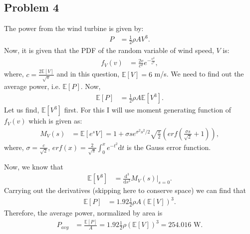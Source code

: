 \subsection*{Problem 4}
The power from the wind turbine is given by:
\begin{align*}
	P &= \frac{1}{2}\rho A V^3.
\end{align*}
Now, it is given that the PDF of the random variable of wind speed, $V$ is:
\begin{align*}
	f_V(v) &= \frac{2v}{c^2}e^{-\frac{v^2}{c^2}},
\end{align*}
where, $c=\frac{2\mathbb{E}[V]}{\sqrt{\pi}}$ and in this question, $\mathbb{E}[V] = 6$ m/s. We need to find out the average power, i.e. $\mathbb{E}[P]$. Now,
\begin{align*}
	\mathbb{E}[P] &= \frac{1}{2}\rho A \mathbb{E}[V^3].
\end{align*}
Let us find, $\mathbb{E}[V^3]$ first. For this I will use moment generating function of $f_V(v)$ which is given as:
\begin{align*}
	M_V(s) &= \mathbb{E}[e^sV] = 1+\sigma s e^{\sigma^2s^2/2}\sqrt{\frac{\pi}{2}}\left(erf\left(\frac{\sigma s}{\sqrt{2}}+1\right)\right),
\end{align*}
where, $\sigma = \frac{c}{\sqrt{2}}$, $erf(x) = \frac{2}{\sqrt{\pi}}\int_{0}^{x}e^{-t^2}\text{d}t$ is the Gauss error function.

Now, we know that
\begin{align*}
	\mathbb{E}[V^3] &= \frac{\text{d}^3}{\text{d}s^3}M_V(s)\vert_{s=0}.
\end{align*}
Carrying out the derivatives (skipping here to conserve space) we can find that
\begin{align*}
	\mathbb{E}[P] &= 1.92\frac{1}{2}\rho A (\mathbb{E}[V])^3.
\end{align*}
Therefore, the average power, normalized by area is
\begin{align*}
	P_{avg} &= \frac{\mathbb{E}[P]}{A} = 1.92\frac{1}{2}\rho(\mathbb{E}[V])^3 = 254.016\text{ W}.
\end{align*}